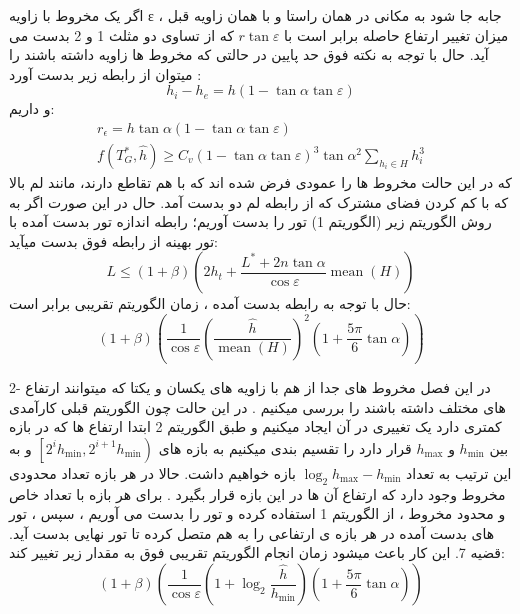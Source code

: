 \documentclass[12pt]{book}
\begin{document}
اگر یک مخروط با زاویه ε جابه جا شود به مکانی در همان راستا و با همان زاویه قبل ، میزان تغییر ارتفاع حاصله برابر است با
$r \tan \varepsilon$
 که از تساوی دو مثلث 1 و 2 بدست می آید.
حال با توجه به نکته فوق حد پایین در حالتی که مخروط ها زاویه داشته باشند را میتوان از رابطه زیر بدست آورد :
\begin{equation}
h_{i}-h_{e}=h(1-\tan \alpha \tan \varepsilon)
\end{equation}
و داریم:
\begin{equation}
\begin{gathered}
r_{\epsilon}=h \tan \alpha(1-\tan \alpha \tan \varepsilon) \\
f\left(T_{G}^{*}, \hat{h}\right) \geq C_{v}(1-\tan \alpha \tan \varepsilon)^{3} \tan \alpha^{2} \sum_{h_{i} \in H} h_{i}^{3}
\end{gathered}
\end{equation}
که در این حالت مخروط ها را عمودی فرض شده اند که با هم تقاطع دارند، مانند لم بالا که با کم کردن فضای مشترک که از رابطه لم دو بدست آمد.
حال در این صورت اگر به روش الگوریتم زیر (الگوریتم 1) تور را بدست آوریم؛ رابطه اندازه تور بدست آمده با تور بهینه از رابطه فوق بدست میآید:
\begin{equation}
L \leq(1+\beta)\left(2 h_{t}+\frac{L^{*}+2 n \tan \alpha}{\cos \varepsilon} \operatorname{mean}(H)\right)
\end{equation}
حال با توجه به رابطه بدست آمده ، زمان الگوریتم تقریبی برابر است:
\begin{equation}
(1+\beta)\left(\frac{1}{\cos \varepsilon}\left(\frac{\widehat{h}}{\operatorname{mean}(H)}\right)^{2}\left(1+\frac{5 \pi}{6} \tan \alpha\right)\right)
\end{equation}

2-
در این فصل مخروط های جدا از هم با زاویه های یکسان و یکتا که میتوانند ارتفاع های مختلف داشته باشند را بررسی میکنیم .
در این حالت چون الگوریتم قبلی کارآمدی کمتری دارد یک تغییری در آن ایجاد میکنیم و طبق الگوریتم 2 ابتدا ارتفاع ها که در بازه بین
$ h_{\min }  $
 و
$h_{\max }$
قرار دارد را تقسیم بندی میکنیم به بازه های 
$\left[2^{i} h_{\min }, 2^{i+1} h_{\min }\right)$
و به این ترتیب به تعداد
$\log _{2} h_{\max }-h_{\min }$
 بازه خواهیم داشت. حالا در هر بازه تعداد محدودی مخروط وجود دارد که ارتفاع آن ها در این بازه قرار بگیرد . برای هر بازه با تعداد خاص و محدود مخروط ، از الگوریتم 1 استفاده کرده و تور را بدست می آوریم ، سپس ، تور های بدست آمده در هر بازه ی ارتفاعی را به هم متصل کرده تا تور نهایی بدست آید.
قضیه 7.
این کار باعث میشود زمان انجام الگوریتم تقریبی فوق به مقدار زیر تغییر کند:
\begin{equation}
(1+\beta)\left(\frac{1}{\cos \varepsilon}\left(1+\log _{2} \frac{\widehat{h}}{h_{\min }}\right)\left(1+\frac{5 \pi}{6} \tan \alpha\right)\right)
\end{equation}
\end{document}
